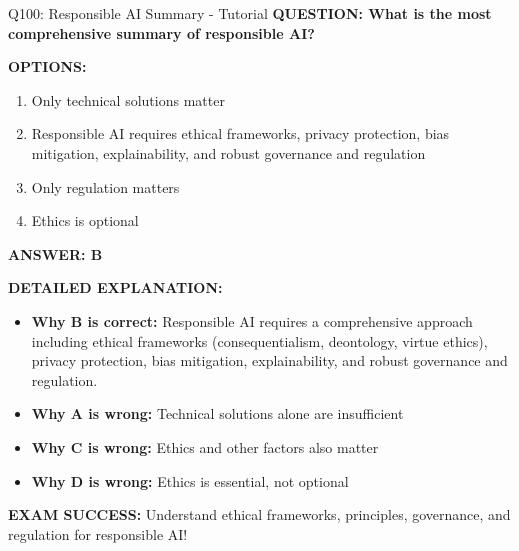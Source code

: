 \documentclass[8pt]{beamer}
\begin{document}
	\begin{frame}{Q100: Responsible AI Summary - Tutorial}
		\fontsize{6.5}{7.5}\selectfont
		\textbf{QUESTION: What is the most comprehensive summary of responsible AI?}
		
		\vspace{0.1cm}
		\textbf{OPTIONS:}
		\begin{enumerate}
			\item Only technical solutions matter
			\item Responsible AI requires ethical frameworks, privacy protection, bias mitigation, explainability, and robust governance and regulation
			\item Only regulation matters
			\item Ethics is optional
		\end{enumerate}
		
		\vspace{0.1cm}
		\textcolor{myblue}{\textbf{ANSWER: B}}
		
		\vspace{0.1cm}
		\textbf{DETAILED EXPLANATION:}
		\begin{itemize}
			\item \textbf{Why B is correct:} Responsible AI requires a comprehensive approach including ethical frameworks (consequentialism, deontology, virtue ethics), privacy protection, bias mitigation, explainability, and robust governance and regulation.
			\item \textbf{Why A is wrong:} Technical solutions alone are insufficient
			\item \textbf{Why C is wrong:} Ethics and other factors also matter
			\item \textbf{Why D is wrong:} Ethics is essential, not optional
		\end{itemize}
		
		\textcolor{myred}{\textbf{EXAM SUCCESS:}} Understand \textcolor{myblue}{ethical frameworks, principles, governance, and regulation} for responsible AI!
	\end{frame}
	
\end{document}
